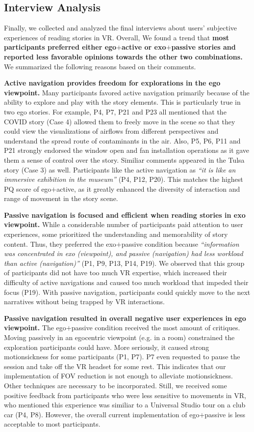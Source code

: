\subsection{Interview Analysis}
Finally, we collected and analyzed the final interviews about users' subjective experiences of reading stories in VR. Overall, We found a trend that \textbf{most participants preferred either ego$+$active or exo$+$passive stories and reported less favorable opinions towards the other two combinations.} We summarized the following reasons based on their comments.

\textbf{Active navigation provides freedom for explorations in the ego viewpoint.} Many participants favored active navigation primarily because of the ability to explore and play with the story elements. This is particularly true in two ego stories. For example, P4, P7, P21 and P23 all mentioned that the COVID story (Case 4) allowed them to freely move in the scene so that they could view the visualizations of airflows from different perspectives and understand the spread route of contaminants in the air. Also, P5, P6, P11 and P21 strongly endorsed the window open and fan installation operations as it gave them a sense of control over the story. Similiar comments appeared in the Tulsa story (Case 3) as well. Participants like the active navigation as \textit{``it is like an immersive exhibition in the museum''} (P4, P12, P20). This matches the highest PQ score of ego$+$active, as it greatly enhanced the diversity of interaction and range of movement in the story scene.

\textbf{Passive navigation is focused and efficient when reading stories in exo viewpoint.} While a considerable number of participants paid attention to user experiences, some prioritized the understanding and memorability of story content. Thus, they preferred the exo$+$passive condition because \textit{``information was concentrated in exo (viewpoint), and passive (navigation) had less workload than active (navigation)''} (P1, P9, P13, P14, P19). We observed that this group of participants did not have too much VR expertise, which increased their difficulty of active navigations and caused too much workload that impeded their focus (P19). With passive navigation, participants could quickly move to the next narratives without being trapped by VR interactions.

\textbf{Passive navigation resulted in overall negative user experiences in ego viewpoint.} The ego$+$passive condition received the most amount of critiques. Moving passively in an egocentric viewpoint (e.g. in a room) constrained the exploration participants could have. More seriously, it caused strong motionsickness for some participants (P1, P7). P7 even requested to pause the session and take off the VR headset for some rest. This indicates that our implementation of FOV reduction is not enough to alleviate motionsickness. Other techniques are necessary to be incorporated. Still, we received some positive feedback from participants who were less sensitive to movements in VR, who mentioned this experience was similiar to a Universal Studio tour on a club car (P4, P8). However, the overall current implementation of ego$+$passive is less acceptable to most participants.


